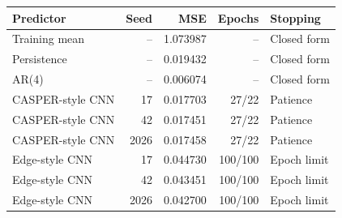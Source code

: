\begin{tabular}{lrrrl}\toprule
Predictor & Seed & MSE & Epochs & Stopping \\\midrule
Training mean & -- & 1.073987 & -- & Closed form \\
Persistence & -- & 0.019432 & -- & Closed form \\
AR(4) & -- & 0.006074 & -- & Closed form \\
CASPER-style CNN & 17 & 0.017703 & 27/22 & Patience \\
CASPER-style CNN & 42 & 0.017451 & 27/22 & Patience \\
CASPER-style CNN & 2026 & 0.017458 & 27/22 & Patience \\
Edge-style CNN & 17 & 0.044730 & 100/100 & Epoch limit \\
Edge-style CNN & 42 & 0.043451 & 100/100 & Epoch limit \\
Edge-style CNN & 2026 & 0.042700 & 100/100 & Epoch limit \\
\bottomrule\end{tabular}
